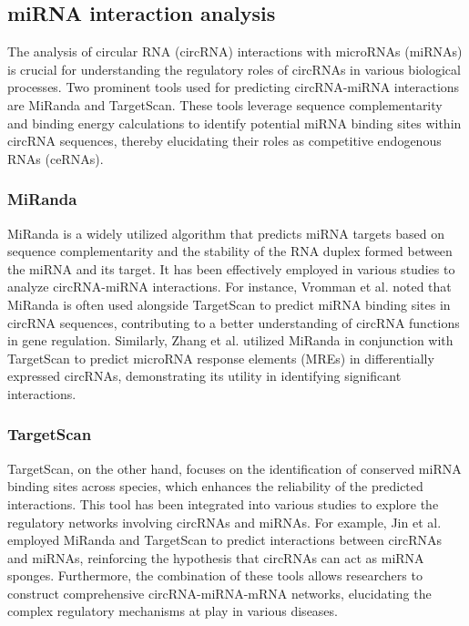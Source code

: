 \subsection{miRNA interaction analysis}
The analysis of circular RNA (circRNA) interactions with microRNAs (miRNAs) is
crucial for understanding the regulatory roles of circRNAs in various
biological processes.
Two prominent tools used for predicting circRNA-miRNA interactions are MiRanda
and TargetScan.
These tools leverage sequence complementarity and binding energy calculations
to identify potential miRNA binding sites within circRNA sequences, thereby
elucidating their roles as competitive endogenous RNAs (ceRNAs).

\subsubsection{MiRanda}
MiRanda is a widely utilized algorithm that predicts miRNA targets based on
sequence complementarity and the stability of the RNA duplex formed between the
miRNA and its target.
It has been effectively employed in various studies to analyze circRNA-miRNA
interactions.
For instance, Vromman et al.
noted that
MiRanda is often used alongside TargetScan to predict miRNA binding sites in
circRNA sequences, contributing to a better understanding of circRNA functions
in gene regulation\supercite{vromman_closing_2021}.
Similarly, Zhang et al.
utilized
MiRanda in conjunction with TargetScan to predict microRNA response elements
(MREs) in differentially expressed circRNAs, demonstrating its utility in
identifying significant interactions\supercite{zhang_microarray_2017}.

\subsubsection{TargetScan}
TargetScan, on the other hand, focuses on the identification of conserved miRNA
binding sites across species, which enhances the reliability of the predicted
interactions.
This tool has been integrated into various studies to explore the regulatory
networks involving circRNAs and miRNAs.
For example, Jin et al.
employed MiRanda and TargetScan to predict interactions between circRNAs and
miRNAs, reinforcing the hypothesis that circRNAs can act as miRNA
sponges\supercite{jin_changes_2018}.
Furthermore, the combination of these tools allows researchers to construct
comprehensive circRNA-miRNA-mRNA networks, elucidating the complex regulatory
mechanisms at play in various
diseases\supercite{he_construction_2021,zhang_construction_2021}.


